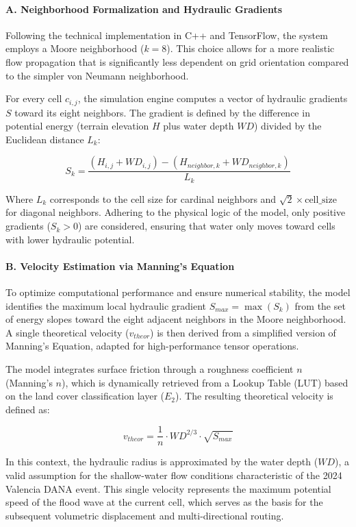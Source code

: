 \paragraph{A. Neighborhood Formalization and Hydraulic Gradients}

Following the technical implementation in C++ and TensorFlow, the system employs a Moore neighborhood ($k=8$). This choice allows for 
a more realistic flow propagation that is significantly less dependent on grid orientation compared to the simpler von Neumann 
neighborhood.

For every cell $c_{i,j}$, the simulation engine computes a vector of hydraulic gradients $S$ toward its eight neighbors. The gradient 
is defined by the difference in potential energy (terrain elevation $H$ plus water depth $WD$) divided by the Euclidean distance $L_{k}$:

$$S_{k} = \frac{(H_{i,j} + WD_{i,j}) - (H_{neighbor,k} + WD_{neighbor,k})}{L_{k}}$$

Where $L_{k}$ corresponds to the cell size for cardinal neighbors and $\sqrt{2} \times \text{cell\_size}$ for diagonal neighbors. 
Adhering to the physical logic of the model, only positive gradients ($S_k > 0$) are considered, ensuring that water only moves toward 
cells with lower hydraulic potential.

\paragraph{B. Velocity Estimation via Manning’s Equation}

To optimize computational performance and ensure numerical stability, the model identifies the maximum local hydraulic gradient 
$S_{max} = \max(S_k)$ from the set of energy slopes toward the eight adjacent neighbors in the Moore neighborhood. A single theoretical 
velocity ($v_{theor}$) is then derived from a simplified version of Manning’s Equation, adapted for high-performance tensor operations.

The model integrates surface friction through a roughness coefficient $n$ (Manning’s $n$), which is dynamically retrieved from a Lookup 
Table (LUT) based on the land cover classification layer ($E_2$). The resulting theoretical velocity is defined as:

$$v_{theor} = \frac{1}{n} \cdot WD^{2/3} \cdot \sqrt{S_{max}}$$

In this context, the hydraulic radius is approximated by the water depth ($WD$), a valid assumption for the shallow-water flow conditions 
characteristic of the 2024 Valencia DANA event. This single velocity represents the maximum potential speed of the flood wave at the 
current cell, which serves as the basis for the subsequent volumetric displacement and multi-directional routing.


